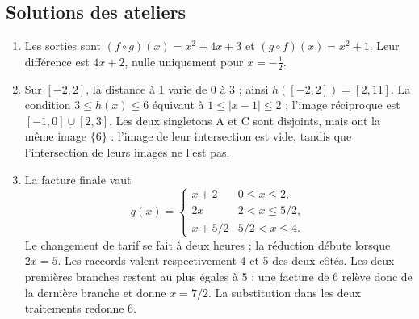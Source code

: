 \subsection{Solutions des ateliers}
\begin{enumerate}
\item Les sorties sont $(f\circ g)(x)=x^{2} + 4 x + 3$ et $(g\circ f)(x)=x^{2} + 1$. Leur différence est $4 x + 2$, nulle uniquement pour $x=- \frac{1}{2}$.
\item Sur $[-2,2]$, la distance à 1 varie de 0 à 3 ; ainsi $h([-2,2])=[2,11]$. La condition $3\leq h(x)\leq6$ équivaut à $1\leq|x-1|\leq2$ ; l'image réciproque est $[-1,0]\cup[2,3]$. Les deux singletons A et C sont disjoints, mais ont la même image $\{6\}$ : l'image de leur intersection est vide, tandis que l'intersection de leurs images ne l'est pas.
\item La facture finale vaut
\[q(x)=\begin{cases}x+2&0\leq x\leq2,\\2x&2<x\leq5/2,\\x+5/2&5/2<x\leq4.\end{cases}\]
Le changement de tarif se fait à deux heures ; la réduction débute lorsque $2x=5$. Les raccords valent respectivement 4 et 5 des deux côtés. Les deux premières branches restent au plus égales à 5 ; une facture de 6 relève donc de la dernière branche et donne $x=7/2$. La substitution dans les deux traitements redonne 6.
\end{enumerate}
